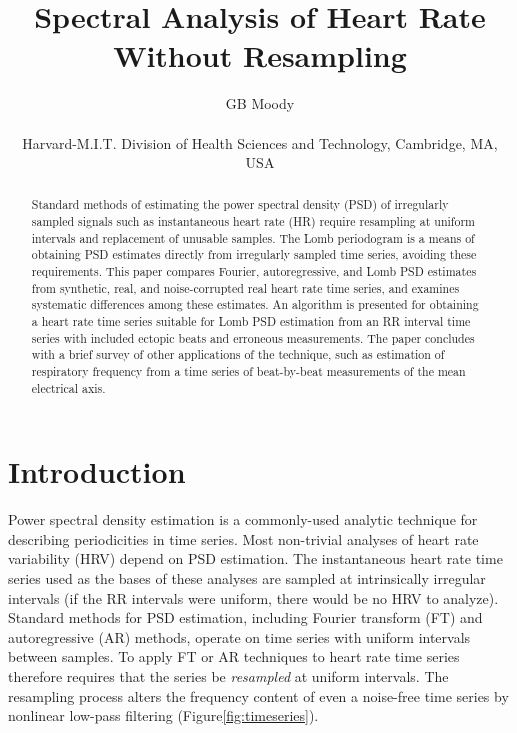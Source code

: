 \documentclass[twocolumn]{cinc}
\begin{document}


\title{Spectral Analysis of Heart Rate Without Resampling}

\author {
GB Moody\\
\ \\
Harvard-M.I.T. Division of Health Sciences and Technology, Cambridge, MA, USA}

\maketitle

\begin{abstract}
Standard methods of estimating the power spectral density (PSD)
of irregularly sampled signals such as instantaneous heart rate (HR)
require resampling at uniform intervals and replacement of unusable
samples.  The Lomb periodogram is a means of obtaining PSD estimates
directly from irregularly sampled time series, avoiding these
requirements.  This paper compares Fourier, autoregressive, and Lomb
PSD estimates from synthetic, real, and noise-corrupted real heart
rate time series, and examines systematic differences among these
estimates.  An algorithm is presented for obtaining a heart rate time
series suitable for Lomb PSD estimation from an RR interval time
series with included ectopic beats and erroneous measurements.  The
paper concludes with a brief survey of other applications of the
technique, such as estimation of respiratory frequency from a time
series of beat-by-beat measurements of the mean electrical axis.
\end{abstract}

\section{Introduction}

Power spectral density estimation is a commonly-used analytic
technique for describing periodicities in time series.  Most
non-trivial analyses of heart rate variability (HRV) depend on PSD
estimation.  The instantaneous heart rate time series used as the
bases of these analyses are sampled at intrinsically irregular
intervals (if the RR intervals were uniform, there would be no HRV to
analyze).  Standard methods for PSD estimation, including Fourier
transform (FT) and autoregressive (AR) methods, operate on time series
with uniform intervals between samples.  To apply FT or AR techniques
to heart rate time series therefore requires that the series be {\em
resampled} at uniform intervals\cite{RD-84,RB-86,GM-92}.  The
resampling process alters the frequency content of even a noise-free
time series by nonlinear low-pass filtering (Figure\ref{fig:timeseries}).
\end{document}
